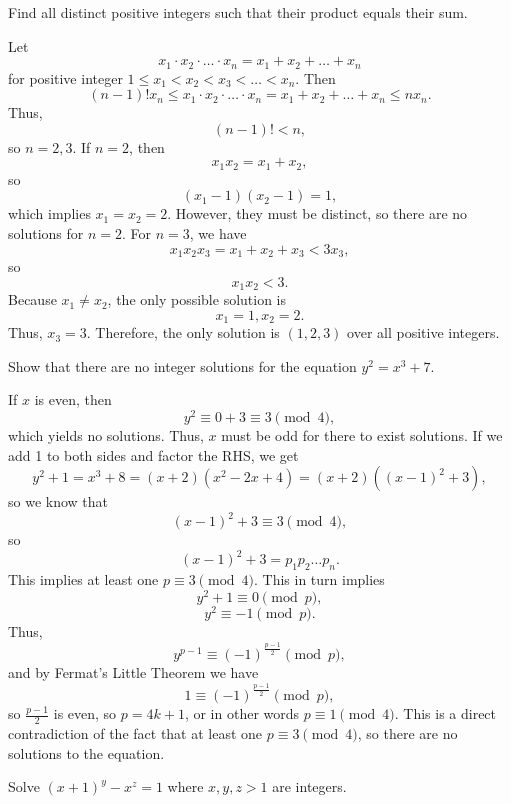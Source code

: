 \documentclass[mast]{lucky}
\begin{document}
\begin{exam}
Find all distinct positive integers such that their product equals their sum.
\end{exam}
\begin{sol}
Let
$$x_1 \cdot x_2 \cdot \ldots \cdot x_n = x_1 + x_2 + \ldots + x_n$$
for positive integer $1\le x_1 < x_2 < x_3 < \ldots < x_n$. Then
$$(n-1)! x_n \le x_1 \cdot x_2 \cdot \ldots \cdot x_n = x_1 + x_2 + \ldots + x_n \le nx_n.$$
Thus,
$$(n-1)! < n,$$
so $n=2,3$. If $n=2$, then
$$x_1x_2 = x_1 + x_2,$$
so
$$(x_1-1)(x_2-1) = 1,$$
which implies $x_1=x_2=2$. However, they must be distinct, so there are no solutions for $n=2$. For $n=3$, we have
$$x_1x_2x_3 = x_1+x_2+x_3<3x_3,$$
so
$$x_1x_2<3.$$
Because $x_1 \neq x_2$, the only possible solution is
$$x_1=1,x_2=2.$$
Thus, $x_3=3$. Therefore, the only solution is $(1,2,3)$ over all positive integers.
\end{sol}
\begin{exam}
Show that there are no integer solutions for the equation $y^2=x^3+7$.
\end{exam}
\begin{sol}
If $x$ is even, then
$$y^2 \equiv 0 + 3 \equiv 3 \pmod{4},$$
which yields no solutions. Thus, $x$ must be odd for there to exist solutions. If we add 1 to both sides and factor the RHS, we get
$$y^2+1 = x^3 + 8 = (x+2)(x^2-2x+4) = (x+2)((x-1)^2+3),$$
so we know that
$$(x-1)^2 + 3 \equiv 3 \pmod{4},$$
so
$$(x-1)^2 + 3 = p_1p_2\ldots p_n.$$
This implies at least one $p\equiv 3\pmod{4}$. This in turn implies
$$y^2+1 \equiv 0 \pmod{p},$$
$$y^2 \equiv -1 \pmod{p}.$$
Thus,
$$y^{p-1} \equiv (-1)^{\frac{p-1}{2}} \pmod{p},$$
and by Fermat's Little Theorem we have
$$1 \equiv (-1)^{\frac{p-1}{2}} \pmod{p},$$
so $\frac{p-1}{2}$ is even, so $p=4k+1$, or in other words $p \equiv 1\pmod{4}$. This is a direct contradiction of the fact that at least one $p\equiv 3\pmod{4}$, so there are no solutions to the equation.
\end{sol}
\begin{exam}
Solve $(x+1)^y - x^z = 1$ where $x,y,z>1$ are integers.
\end{exam}
\end{document}

